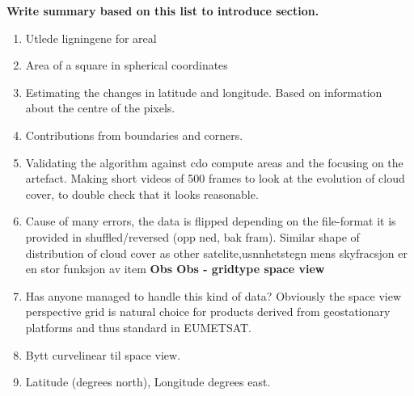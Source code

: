 \textbf{Write summary based on this list to introduce section.}
\begin{enumerate}
    \item Utlede ligningene for areal
    \item Area of a square in spherical coordinates
    \item Estimating the changes in latitude and longitude. Based on information about the centre of the pixels. 
    \item Contributions from boundaries and corners. 
    \item Validating the algorithm against cdo compute areas and the focusing on the artefact. Making short videos of 500 frames to look at the evolution of cloud cover, to double check that it looks reasonable. 
    \item Cause of many errors, the data is flipped depending on the file-format it is provided in shuffled/reversed (opp ned, bak fram). Similar shape of distribution of cloud cover as other satelite,usnnhetstegn mens skyfracsjon er en stor funksjon av 
    item \textbf{Obs Obs - gridtype space view}
    \item Has anyone managed to handle this kind of data? Obviously the space view perspective grid is natural choice for products derived from geostationary platforms and thus standard in EUMETSAT. 
    \item Bytt curvelinear til space view.
    \item Latitude (degrees north), Longitude degrees east.
\end{enumerate}

